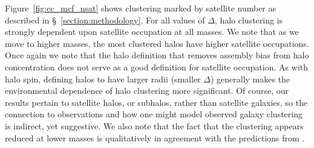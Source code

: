 \documentclass[usenatbib,fleqn]{mnras}
\begin{document}
Figure~\ref{fig:cc_mcf_nsat} shows clustering marked by satellite number as described in 
\S~\ref{section:methodology}. For all values of $\Delta$, halo clustering is strongly dependent 
upon satellite occupation at all masses. We note that as we move to higher masses, the most clustered halos have higher satellite occupations. Once again we note that the halo definition that removes assembly bias from halo concentration does not serve as a good definition for satellite occupation. As with halo spin, defining halos to have larger radii (smaller 
$\Delta$) generally makes the environmental dependence of halo clustering more 
significant. Of course, our results pertain to satellite halos, or subhalos, rather than 
satellite galaxies, so the connection to observations and how one might 
model observed galaxy clustering is indirect, yet suggestive. We also note that the fact that the clustering
appears reduced at lower masses is qualitatively in agreement with the predictions from \citet{wechsler_etal06}. 
\end{document}
